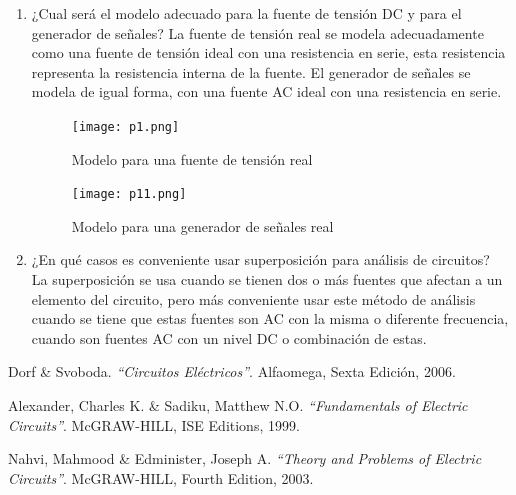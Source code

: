 \documentclass[twocolumn]{IEEEtran}
\begin{document}
\begin{enumerate}
 \item ¿Cual será el modelo adecuado para la fuente de tensión DC y para el generador de señales?
La fuente de tensión real se modela adecuadamente como una fuente de tensión ideal con una resistencia en serie, esta resistencia representa la resistencia interna de la fuente. El generador de señales se modela de igual forma, con una fuente AC ideal  con una resistencia en serie.
\begin{figure}[H]
	\centering
		\texttt{[image: p1.png]}
	\caption{Modelo para una fuente de tensión real}
	\label{fig10}
\end{figure}
\begin{figure}[H]
	\centering
		\texttt{[image: p11.png]}
	\caption{Modelo para una generador de señales real}
	\label{fig11}
\end{figure}

 \item ¿En qué casos es conveniente usar superposición para análisis de circuitos?\\
La superposición se usa cuando se tienen dos o más fuentes que afectan a un elemento del circuito, pero más conveniente usar este método de análisis cuando se tiene que estas fuentes son AC con la misma o diferente frecuencia, cuando son fuentes AC con un nivel DC o combinación de estas.
\end{enumerate}


\begin{thebibliography}{99}
 Dorf  \& Svoboda.
{\em "`Circuitos Eléctricos"'}.
Alfaomega, Sexta Edición, 2006.

 Alexander, Charles K. \&  Sadiku, Matthew N.O.
{\em "`Fundamentals of Electric Circuits"'}.
McGRAW-HILL, ISE Editions, 1999.

 Nahvi, Mahmood \& Edminister, Joseph A.
{\em "`Theory and Problems of Electric Circuits"'}.
McGRAW-HILL, Fourth Edition, 2003.
\end{thebibliography}
\end{document}
